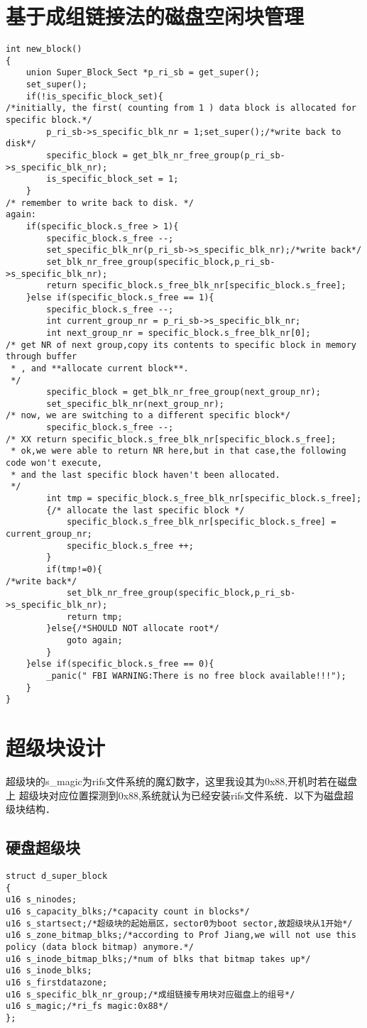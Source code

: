 \section{基于成组链接法的磁盘空闲块管理}
\begin{verbatim}    
int new_block()
{
	union Super_Block_Sect *p_ri_sb = get_super();
	set_super();
	if(!is_specific_block_set){
/*initially, the first( counting from 1 ) data block is allocated for specific block.*/		
		p_ri_sb->s_specific_blk_nr = 1;set_super();/*write back to disk*/
		specific_block = get_blk_nr_free_group(p_ri_sb->s_specific_blk_nr);
		is_specific_block_set = 1;
	}
/* remember to write back to disk. */	
again:	
	if(specific_block.s_free > 1){
		specific_block.s_free --;
		set_specific_blk_nr(p_ri_sb->s_specific_blk_nr);/*write back*/
		set_blk_nr_free_group(specific_block,p_ri_sb->s_specific_blk_nr);
		return specific_block.s_free_blk_nr[specific_block.s_free];
	}else if(specific_block.s_free == 1){
		specific_block.s_free --;
		int current_group_nr = p_ri_sb->s_specific_blk_nr;
		int next_group_nr = specific_block.s_free_blk_nr[0];
/* get NR of next group,copy its contents to specific block in memory through buffer
 * , and **allocate current block**. 
 */
		specific_block = get_blk_nr_free_group(next_group_nr);
		set_specific_blk_nr(next_group_nr);
/* now, we are switching to a different specific block*/		
		specific_block.s_free --;
/* XX return specific_block.s_free_blk_nr[specific_block.s_free];
 * ok,we were able to return NR here,but in that case,the following code won't execute,
 * and the last specific block haven't been allocated.
 */		
		int tmp = specific_block.s_free_blk_nr[specific_block.s_free];
		{/* allocate the last specific block */
			specific_block.s_free_blk_nr[specific_block.s_free] = current_group_nr; 
			specific_block.s_free ++; 
		}
		if(tmp!=0){
/*write back*/
			set_blk_nr_free_group(specific_block,p_ri_sb->s_specific_blk_nr);
			return tmp;
		}else{/*SHOULD NOT allocate root*/
			goto again;
		}
	}else if(specific_block.s_free == 0){
		_panic(" FBI WARNING:There is no free block available!!!");
	}	
}
\end{verbatim}
\section{超级块设计}
超级块的s\_magic为rifs文件系统的魔幻数字，这里我设其为0x88,开机时若在磁盘上
超级块对应位置探测到0x88,系统就认为已经安装rifs文件系统．以下为磁盘超级块结构．

\subsection{硬盘超级块}
\begin{verbatim}    
struct d_super_block
{
u16 s_ninodes;
u16 s_capacity_blks;/*capacity count in blocks*/
u16 s_startsect;/*超级块的起始扇区，sector0为boot sector,故超级块从1开始*/
u16 s_zone_bitmap_blks;/*according to Prof Jiang,we will not use this policy (data block bitmap) anymore.*/
u16 s_inode_bitmap_blks;/*num of blks that bitmap takes up*/
u16 s_inode_blks;
u16 s_firstdatazone;
u16 s_specific_blk_nr_group;/*成组链接专用块对应磁盘上的组号*/
u16 s_magic;/*ri_fs magic:0x88*/
};    
\end{verbatim}

